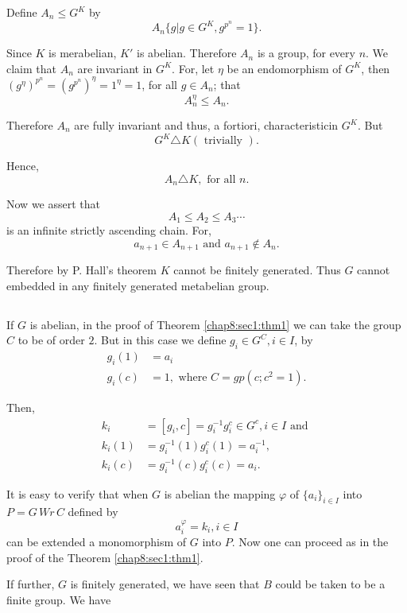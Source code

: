  Define $A_n \le G^K$ by
 $$
 A_n \bigg\{ g \bigg| g \in G^K,  g^{p^{n}} = 1\bigg\}.
 $$

 Since $K$ is merabelian, $K'$ is abelian. Therefore $A_n$ is a group,
 for every $n$. We claim that $A_n$ are invariant in $G^K$. For, let
 $\eta$ be an endomorphism of $G^K$, then $(g^\eta)^{p^n} =
 (g^{p{^n}})^\eta = 1^\eta = 1$, for all $g \in A_n$; that   
 $$
 A_n^\eta \le A_n.
 $$

 Therefore $A_n$ are fully invariant and thus, a fortiori,
 characteristic\pageoriginale in $G^K$. But 
 $$
 G^K \triangle K (\text { trivially }).
 $$

 Hence,
 $$
 A_n \triangle K, \text { for all } n.
 $$

 Now we assert that
 $$
 A_1 \le A_2 \le A_3 \cdots
 $$
 is an infinite strictly ascending chain. For,
 $$
 a_{n+1} \in A_{n+1} \text { and } a_{n+1} \notin A_n.
 $$

 Therefore by P. Hall's theorem $K$ cannot be finitely generated. Thus
 $G$ cannot embedded in any finitely generated metabelian group. 

\subsection{}\label{chap8:sec2:subsec3} 
If $G$ is abelian, in the proof of Theorem \ref{chap8:sec1:thm1}
we can take the group 
$C$ to be of order $2$. But in this case we define $g_i \in
G^C, i \in I$, by 
\begin{align*}
  g_i (1) &= a_i\\
  g_i (c) &= 1, \text{ where } C = gp (c; c^2 = 1).
\end{align*}

Then,\pageoriginale
\begin{align*}
  k_i & = [g_i,c]= g^{-1}_i g^c_i \in G^c, i \in I \text{ and }\\
  k_i(1) & = g^{-1}_i (1) g^c_i (1) = a^{-1}_i,\\
  k_i(c) & = g^{-1}_i(c) g^c_i(c) = a_i.  
\end{align*}

It is easy to verify that when $G$ is abelian the mapping $\varphi$ of
$\big\{ a_i \big\}_{i \in I}$ into $P= G \,Wr \,C$ defined by   
$$
a^{\varphi}_i = k_i, i \in I
$$
can be extended a monomorphism of $G$ into $P$. Now one can proceed as
in the proof of the Theorem \ref{chap8:sec1:thm1}. 

If further, $G$ is finitely generated, we have seen that $B$ could be
taken to be a finite group. We have 


